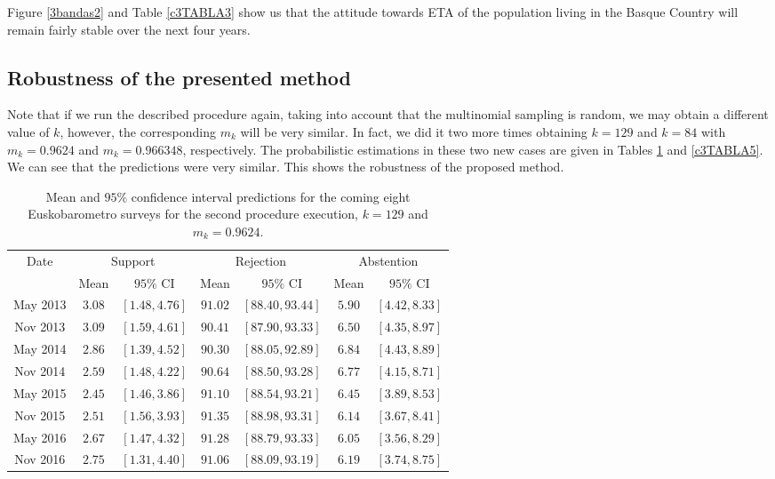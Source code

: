Figure \ref{3bandas2} and Table \ref{c3TABLA3} show us that the attitude towards ETA of the population living in the Basque Country will remain fairly stable over the next four years.

\subsection{Robustness of the presented method}
Note that if we run the described procedure again, taking into account that the multinomial sampling is random, we may obtain a different value of $k$, however, the corresponding $m_k$ will be very similar. In fact, we did it two more times obtaining $k=129$ and $k=84$ with $m_k=0.9624$ and $m_k=0.966348$, respectively. The probabilistic estimations in these two new cases are given in Tables \ref{c3TABLA4} and \ref{c3TABLA5}. We can see that the predictions were very similar. This shows the robustness of the proposed method.

\begin{table}[h]
\centering
\begin{small}
\begin{tabular}{|c|c|c|c|c|c|c|}
\hline
Date    & \multicolumn{2}{c|}{Support} & \multicolumn{2}{c|}{Rejection} & \multicolumn{2}{c|}{Abstention} 	\\
		& Mean & $95\%$ CI & Mean & $95\%$ CI & Mean & $95\%$ CI \\
\hline
May 2013 & $  3.08$ & $[  1.48,  4.76]$ & $ 91.02$ & $[ 88.40, 93.44]$ & $  5.90$ & $[  4.42,  8.33]$ \\ 
Nov 2013 & $  3.09$ & $[  1.59,  4.61]$ & $ 90.41$ & $[ 87.90, 93.33]$ & $  6.50$ & $[  4.35,  8.97]$ \\ 
May 2014 & $  2.86$ & $[  1.39,  4.52]$ & $ 90.30$ & $[ 88.05, 92.89]$ & $  6.84$ & $[  4.43,  8.89]$ \\ 
Nov 2014 & $  2.59$ & $[  1.48,  4.22]$ & $ 90.64$ & $[ 88.50, 93.28]$ & $  6.77$ & $[  4.15,  8.71]$ \\ 
May 2015 & $  2.45$ & $[  1.46,  3.86]$ & $ 91.10$ & $[ 88.54, 93.21]$ & $  6.45$ & $[  3.89,  8.53]$ \\ 
Nov 2015 & $  2.51$ & $[  1.56,  3.93]$ & $ 91.35$ & $[ 88.98, 93.31]$ & $  6.14$ & $[  3.67,  8.41]$ \\ 
May 2016 & $  2.67$ & $[  1.47,  4.32]$ & $ 91.28$ & $[ 88.79, 93.33]$ & $  6.05$ & $[  3.56,  8.29]$ \\ 
Nov 2016 & $  2.75$ & $[  1.31,  4.40]$ & $ 91.06$ & $[ 88.09, 93.19]$ & $  6.19$ & $[  3.74,  8.75]$ \\ 
\hline 
\end{tabular} 
\end{small}
\caption{Mean and $95\%$ confidence interval predictions for the coming eight Euskobarometro surveys for the second procedure execution, $k=129$ and $m_k=0.9624$.}
\label{c3TABLA4} 
\end{table}

